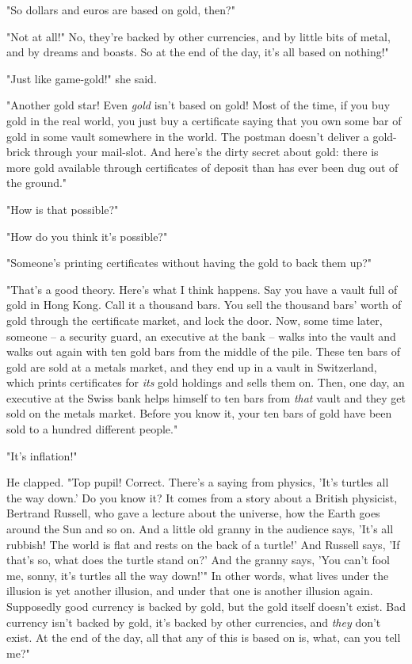 "So dollars and euros are based on gold, then?"

"Not at all!" No, they're backed by other currencies, and by little
bits of metal, and by dreams and boasts. So at the end of the day,
it's all based on nothing!"

"Just like game-gold!" she said.

"Another gold star! Even \emph{gold} isn't based on gold! Most of
the time, if you buy gold in the real world, you just buy a
certificate saying that you own some bar of gold in some vault
somewhere in the world. The postman doesn't deliver a gold-brick
through your mail-slot. And here's the dirty secret about gold:
there is more gold available through certificates of deposit than
has ever been dug out of the ground."

"How is that possible?"

"How do you think it's possible?"

"Someone's printing certificates without having the gold to back
them up?"

"That's a good theory. Here's what I think happens. Say you have a
vault full of gold in Hong Kong. Call it a thousand bars. You sell
the thousand bars' worth of gold through the certificate market,
and lock the door. Now, some time later, someone -- a security
guard, an executive at the bank -- walks into the vault and walks
out again with ten gold bars from the middle of the pile. These ten
bars of gold are sold at a metals market, and they end up in a
vault in Switzerland, which prints certificates for \emph{its} gold
holdings and sells them on. Then, one day, an executive at the
Swiss bank helps himself to ten bars from \emph{that} vault and
they get sold on the metals market. Before you know it, your ten
bars of gold have been sold to a hundred different people."

"It's inflation!"

He clapped. "Top pupil! Correct. There's a saying from physics,
'It's turtles all the way down.' Do you know it? It comes from a
story about a British physicist, Bertrand Russell, who gave a
lecture about the universe, how the Earth goes around the Sun and
so on. And a little old granny in the audience says, 'It's all
rubbish! The world is flat and rests on the back of a turtle!' And
Russell says, 'If that's so, what does the turtle stand on?' And
the granny says, 'You can't fool me, sonny, it's turtles all the
way down!'" In other words, what lives under the illusion is yet
another illusion, and under that one is another illusion again.
Supposedly good currency is backed by gold, but the gold itself
doesn't exist. Bad currency isn't backed by gold, it's backed by
other currencies, and \emph{they} don't exist. At the end of the
day, all that any of this is based on is, what, can you tell me?"

